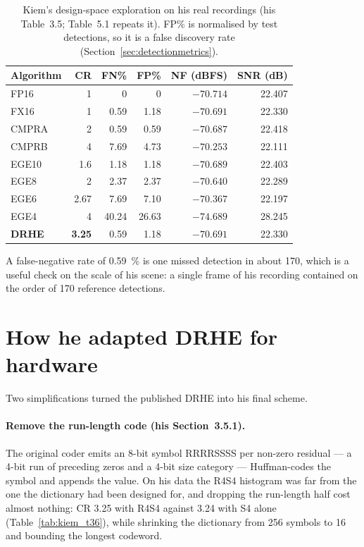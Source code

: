 \begin{table}[htbp]
\centering
\caption[Kiem's design-space results]{Kiem's design-space exploration on his
real recordings (his Table~3.5; Table~5.1 repeats it). FP\% is normalised by
test detections, so it is a false discovery rate
(Section~\ref{sec:detectionmetrics}).}
\label{tab:kiem_t35}
\small
\begin{tabular}{@{}lrrrrr@{}}
\toprule
Algorithm & CR & FN\% & FP\% & NF (dBFS) & SNR (dB)\\
\midrule
FP16  & 1    & 0     & 0     & $-70.714$ & 22.407\\
FX16  & 1    & 0.59  & 1.18  & $-70.691$ & 22.330\\
CMPRA & 2    & 0.59  & 0.59  & $-70.687$ & 22.418\\
CMPRB & 4    & 7.69  & 4.73  & $-70.253$ & 22.111\\
EGE10 & 1.6  & 1.18  & 1.18  & $-70.689$ & 22.403\\
EGE8  & 2    & 2.37  & 2.37  & $-70.640$ & 22.289\\
EGE6  & 2.67 & 7.69  & 7.10  & $-70.367$ & 22.197\\
EGE4  & 4    & 40.24 & 26.63 & $-74.689$ & 28.245\\
\textbf{DRHE} & \textbf{3.25} & 0.59 & 1.18 & $-70.691$ & 22.330\\
\bottomrule
\end{tabular}
\end{table}

\noindent
A false-negative rate of \SI{0.59}{\percent} is one missed detection in about
170, which is a useful check on the scale of his scene: a single frame of his
recording contained on the order of 170 reference detections.

\section{How he adapted DRHE for hardware}
\label{sec:kiem_adapt}

Two simplifications turned the published DRHE into his final scheme.

\paragraph{Remove the run-length code (his Section~3.5.1).} The original coder
emits an 8-bit symbol RRRRSSSS per non-zero residual --- a 4-bit run of
preceding zeros and a 4-bit size category --- Huffman-codes the symbol and
appends the value. On his data the R4S4 histogram was far from the one the
dictionary had been designed for, and dropping the run-length half cost almost
nothing: CR \num{3.25} with R4S4 against \num{3.24} with S4 alone
(Table~\ref{tab:kiem_t36}), while shrinking the dictionary from 256 symbols to
16 and bounding the longest codeword.


